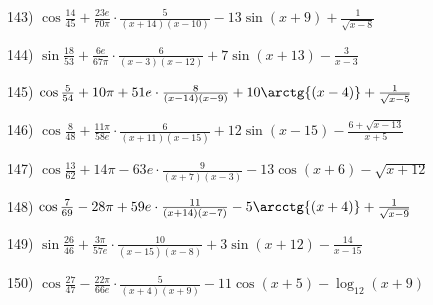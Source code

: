 \documentclass[11pt,ukrainian]{article}
\begin{document}
\smallskip\par
143) \space 
{ ${\cos\frac{14}{45}} + \frac{23 e}{70{\pi}}\cdot {\frac{5}{(x + 14)(x - 10)}} - {13\sin{(x + 9)}} + {\frac{1}{\sqrt{x - 8}}}$}
\smallskip\par
144) \space 
{ ${\sin\frac{18}{53}} + \frac{6 e}{67{\pi}}\cdot {\frac{6}{(x - 3)(x - 12)}} + {7\sin{(x + 13)}} - { \frac{3}{x - 3}}$}
\smallskip\par
145) \space 
{ ${\cos\frac{5}{54}} + 10{\pi} + 51 e\cdot {\frac{8}{(x - 14)(x - 9)}} + {10\arctg{(x - 4)}} + {\frac{1}{\sqrt{x - 5}}}$}
\smallskip\par
146) \space 
{ ${\cos\frac{8}{48}} + \frac{11{\pi}}{58 e}\cdot {\frac{6}{(x + 11)(x - 15)}} + {12\sin{(x - 15)}} - {\frac{6 + \sqrt{x - 13}}{x + 5}}$}
\smallskip\par
147) \space 
{ ${\cos\frac{13}{62}} + 14{\pi} - 63 e\cdot {\frac{9}{(x + 7)(x - 3)}} - {13\cos{(x + 6)}} - {\sqrt{x + 12}}$}
\smallskip\par
148) \space 
{ ${\cos\frac{7}{69}} - 28{\pi} + 59 e\cdot {\frac{11}{(x + 14)(x - 7)}} - {5\arcctg{(x + 4)}} + {\frac{1}{\sqrt{x - 9}}}$}
\smallskip\par
149) \space 
{ ${\sin\frac{26}{46}} + \frac{3{\pi}}{57 e}\cdot {\frac{10}{(x - 15)(x - 8)}} + {3\sin{(x + 12)}} - { \frac{14}{x - 15}}$}
\smallskip\par
150) \space 
{ ${\cos\frac{27}{47}} - \frac{22{\pi}}{66 e}\cdot {\frac{5}{(x + 4)(x + 9)}} - {11\cos{(x + 5)}} - {\log_{12}(x + 9)}$}
\smallskip\par
\end{document}

